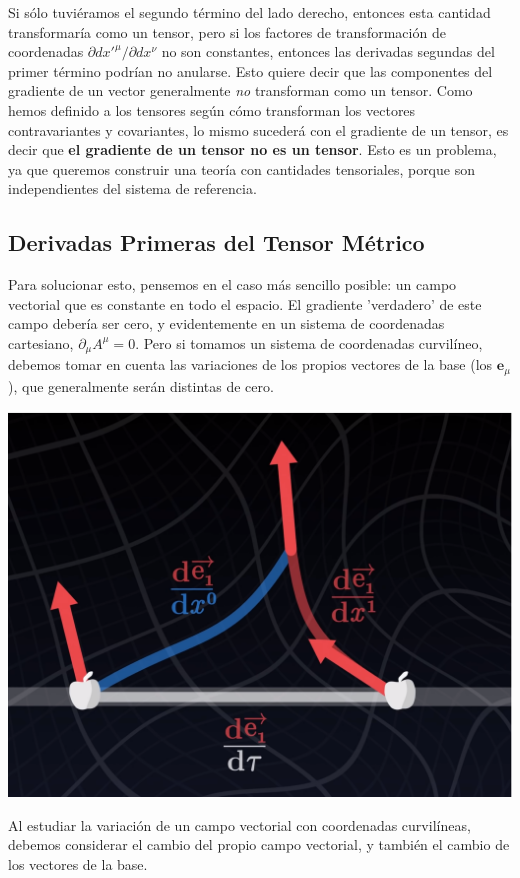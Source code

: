 Si sólo tuviéramos el segundo término del lado derecho, entonces esta cantidad transformaría como un tensor, pero si los factores de transformación de coordenadas $\partial dx'^{\mu}/\partial d x^{\nu}$ no son constantes, entonces las derivadas segundas del primer término podrían no anularse. Esto quiere decir que las componentes del gradiente de un vector generalmente \textit{no} transforman como un tensor. Como hemos definido a los tensores según cómo transforman los vectores contravariantes y covariantes, lo mismo sucederá con el gradiente de un tensor, es decir que \textbf{el gradiente de un tensor no es un tensor}. Esto es un problema, ya que queremos construir una teoría con cantidades tensoriales, porque son independientes del sistema de referencia.

\subsection*{\textbf{Derivadas Primeras del Tensor Métrico}}

Para solucionar esto, pensemos en el caso más sencillo posible: un campo vectorial que es constante en todo el espacio. El gradiente 'verdadero' de este campo debería ser cero, y evidentemente en un sistema de coordenadas cartesiano, $\partial_{\mu}A^{\mu}=0$. Pero si tomamos un sistema de coordenadas curvilíneo, debemos tomar en cuenta las variaciones de los propios vectores de la base (los $\mathbf{e}_{\mu}$), que generalmente serán distintas de cero. 

\begin{marginfigure}
\captionsetup{type=figure}
    \centering
    \includegraphics[width=1.3\textwidth]{Im/cambiocoord.png}
    \caption{Al estudiar la variación de un campo vectorial con coordenadas curvilíneas, debemos considerar el cambio del propio campo vectorial, y también el cambio de los vectores de la base.}
    \label{fig:sen}
\end{marginfigure}

